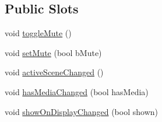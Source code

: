 \subsection*{Public Slots}
\begin{DoxyCompactItemize}
\item 
void \hyperlink{class_u_b_graphics_media_item_a9b73c3e29fe1c5ed124439c3dab5abb9}{toggle\-Mute} ()
\item 
void \hyperlink{class_u_b_graphics_media_item_ac46dcad03dfbda8bc06e6f4e2e897dee}{set\-Mute} (bool b\-Mute)
\item 
void \hyperlink{class_u_b_graphics_media_item_ae01d7aedbbfd3765ba6a11a1bebe723d}{active\-Scene\-Changed} ()
\item 
void \hyperlink{class_u_b_graphics_media_item_ac4b6ce9c71ff792fda87e9a8d2a8a588}{has\-Media\-Changed} (bool has\-Media)
\item 
void \hyperlink{class_u_b_graphics_media_item_a437f10f9df0d715d037e094a1e4ff9ea}{show\-On\-Display\-Changed} (bool shown)
\end{DoxyCompactItemize}
